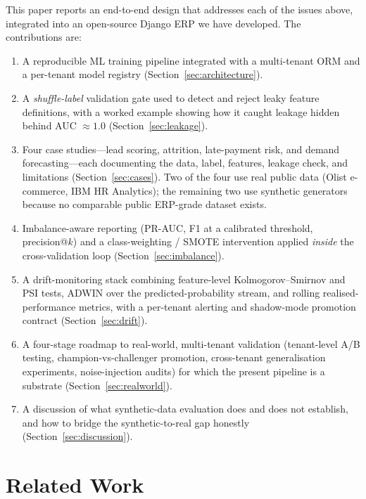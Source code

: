 \documentclass[conference]{IEEEtran}
\begin{document}
This paper reports an end-to-end design that addresses each of the issues
above, integrated into an open-source Django ERP we have developed. The
contributions are:

\begin{enumerate}
    \item A reproducible ML training pipeline integrated with a multi-tenant
    ORM and a per-tenant model registry (Section~\ref{sec:architecture}).
    \item A \emph{shuffle-label} validation gate used to detect and reject
    leaky feature definitions, with a worked example showing how it caught
    leakage hidden behind AUC $\approx 1.0$ (Section~\ref{sec:leakage}).
    \item Four case studies---lead scoring, attrition, late-payment risk,
    and demand forecasting---each documenting the data, label, features,
    leakage check, and limitations
    (Section~\ref{sec:cases}). Two of the four use real public data
    (Olist e-commerce, IBM HR Analytics); the remaining two use synthetic
    generators because no comparable public ERP-grade dataset exists.
    \item Imbalance-aware reporting (PR-AUC, F1 at a calibrated threshold,
    precision@$k$) and a class-weighting / SMOTE intervention applied
    \emph{inside} the cross-validation loop
    (Section~\ref{sec:imbalance}).
    \item A drift-monitoring stack combining feature-level
    Kolmogorov--Smirnov and PSI tests, ADWIN over the predicted-probability
    stream, and rolling realised-performance metrics, with a per-tenant
    alerting and shadow-mode promotion contract
    (Section~\ref{sec:drift}).
    \item A four-stage roadmap to real-world, multi-tenant validation
    (tenant-level A/B testing, champion-vs-challenger promotion,
    cross-tenant generalisation experiments, noise-injection audits) for
    which the present pipeline is a substrate
    (Section~\ref{sec:realworld}).
    \item A discussion of what synthetic-data evaluation does and does not
    establish, and how to bridge the synthetic-to-real gap honestly
    (Section~\ref{sec:discussion}).
\end{enumerate}

\section{Related Work}
\label{sec:related}
\end{document}
